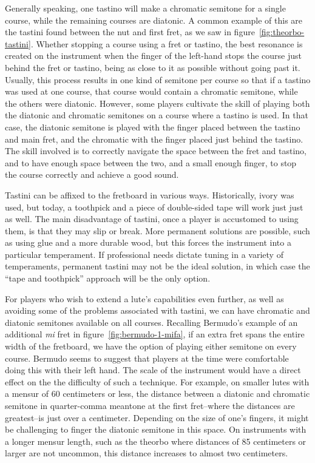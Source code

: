 Generally speaking, one tastino will make a chromatic semitone for a single course, while the
remaining courses are diatonic.  A common example of this are the tastini found between the nut and
first fret, as we saw in figure~\ref{fig:theorbo-tastini}. Whether stopping a course using a fret or
tastino, the best resonance is created on the instrument when the finger of the left-hand stops the
course just behind the  fret or tastino, being as close to it as possible without going past it.
Usually, this process results in one kind of semitone per course so that if a tastino was used at
one course, that course would contain a chromatic semitone, while the others were diatonic.
However, some players  cultivate the skill of playing both the diatonic and chromatic semitones on a
course where a tastino is used. In that case, the diatonic semitone is played with the finger placed
between the tastino and main fret,  and the chromatic with the finger placed just behind the
tastino.  The skill involved is to correctly navigate the space between the fret and tastino, and to
have enough space between the two, and a small enough finger, to stop the course correctly and
achieve a good sound.

Tastini can be affixed to the fretboard in various ways. Historically, ivory was used,
but today, a toothpick and a piece of double-sided tape will work just just as well.  The main
disadvantage of tastini, once a player is accustomed to using them, is that they may
slip or break.  More permanent solutions are possible, such as using glue and a more
durable wood, but this forces the instrument into a particular temperament.  If
professional needs dictate tuning in a variety of temperaments, permanent
tastini may not be the ideal solution, in which case the ``tape and toothpick''
approach will be the only option.

For players who wish to extend a lute's capabilities even further, as well as avoiding
some of the problems associated with tastini, we can have chromatic and diatonic
semitones available on all courses. Recalling Bermudo's example of an additional
\textit{mi} fret in figure~\ref{fig:bermudo-1-mifa}, if an extra fret spans the entire
width of the fretboard, we have the option of playing either semitone on every course.
Bermudo seems to suggest that players at the time were comfortable doing this with their left
hand.  The scale of the instrument would have a direct effect on the the difficulty of
such a technique.  For example, on smaller lutes with a mensur of 60 centimeters or
less, the distance between a diatonic and chromatic semitone in quarter-comma meantone
at the first fret--where the distances are greatest--is just over a centimeter.
Depending on the size of one's fingers, it might be challenging to finger the diatonic
semitone in this space.  On instruments with a longer mensur length, such as the
theorbo where distances of 85 centimeters or larger are not uncommon, this distance
increases to almost two centimeters.

